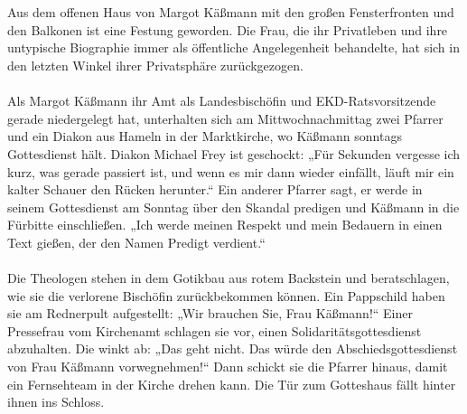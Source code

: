 \documentclass[a4paper,12pt,twoside]{scrbook}
\begin{document}
\\\\
Aus dem offenen Haus von Margot Käßmann mit den großen Fensterfronten und den Balkonen ist eine Festung geworden. Die Frau, die ihr Privatleben und ihre untypische Biographie immer als öffentliche Angelegenheit behandelte, hat sich in den letzten Winkel ihrer Privatsphäre zurückgezogen.
\\\\
Als Margot Käßmann ihr Amt als Landesbischöfin und EKD-Ratsvorsitzende gerade niedergelegt hat, unterhalten sich am Mittwochnachmittag zwei Pfarrer und ein Diakon aus Hameln in der Marktkirche, wo Käßmann sonntags Gottesdienst hält. Diakon Michael Frey ist geschockt: „Für Sekunden vergesse ich kurz, was gerade passiert ist, und wenn es mir dann wieder einfällt, läuft mir ein kalter Schauer den Rücken herunter.“ Ein anderer Pfarrer sagt, er werde in seinem Gottesdienst am Sonntag über den Skandal predigen und Käßmann in die Fürbitte einschließen. „Ich werde meinen Respekt und mein Bedauern in einen Text gießen, der den Namen Predigt verdient.“
\\\\
Die Theologen stehen in dem Gotikbau aus rotem Backstein und beratschlagen, wie sie die verlorene Bischöfin zurückbekommen können. Ein Pappschild haben sie am Rednerpult aufgestellt: „Wir brauchen Sie, Frau Käßmann!“ Einer Pressefrau vom Kirchenamt schlagen sie vor, einen Solidaritätsgottesdienst abzuhalten. Die winkt ab: „Das geht nicht. Das würde den Abschiedsgottesdienst von Frau Käßmann vorwegnehmen!“ Dann schickt sie die Pfarrer hinaus, damit ein Fernsehteam in der Kirche drehen kann. Die Tür zum Gotteshaus fällt hinter ihnen ins Schloss.
\end{document}
